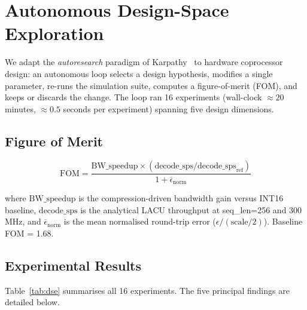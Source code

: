 
\section{Autonomous Design-Space Exploration}
\label{sec:dse}

We adapt the \emph{autoresearch} paradigm of Karpathy~\cite{autoresearch2026}
to hardware coprocessor design: an autonomous loop selects a design
hypothesis, modifies a single parameter, re-runs the simulation suite,
computes a figure-of-merit (FOM), and keeps or discards the change.
The loop ran 16 experiments (wall-clock ${\approx}20$ minutes, ${\approx}0.5$
seconds per experiment) spanning five design dimensions.

\subsection{Figure of Merit}

\[
  \text{FOM} = \frac{\text{BW\_speedup} \times (\text{decode\_sps} /
  \text{decode\_sps}_\text{ref})}{1 + \overline{\epsilon}_\text{norm}}
\]

where $\text{BW\_speedup}$ is the compression-driven bandwidth gain
versus INT16 baseline, $\text{decode\_sps}$ is the analytical LACU
throughput at seq\_len=256 and 300\,MHz, and $\overline{\epsilon}_\text{norm}$
is the mean normalised round-trip error ($\epsilon / (\text{scale}/2)$).
Baseline FOM = 1.68.

\subsection{Experimental Results}

Table~\ref{tab:dse} summarises all 16 experiments. The five principal
findings are detailed below.


